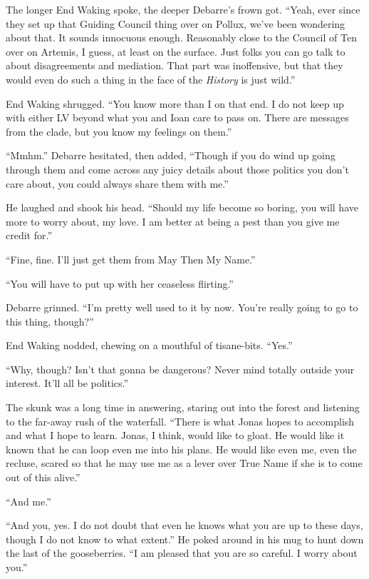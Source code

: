The longer End Waking spoke, the deeper Debarre's frown got. ``Yeah, ever since they set up that Guiding Council thing over on Pollux, we've been wondering about that. It sounds innocuous enough. Reasonably close to the Council of Ten over on Artemis, I guess, at least on the surface. Just folks you can go talk to about disagreements and mediation. That part was inoffensive, but that they would even do such a thing in the face of the \emph{History} is just wild.''

End Waking shrugged. ``You know more than I on that end. I do not keep up with either LV beyond what you and Ioan care to pass on. There are messages from the clade, but you know my feelings on them.''

``Mmhm.'' Debarre hesitated, then added, ``Though if you do wind up going through them and come across any juicy details about those politics you don't care about, you could always share them with me.''

He laughed and shook his head. ``Should my life become so boring, you will have more to worry about, my love. I am better at being a pest than you give me credit for.''

``Fine, fine. I'll just get them from May Then My Name.''

``You will have to put up with her ceaseless flirting.''

Debarre grinned. ``I'm pretty well used to it by now. You're really going to go to this thing, though?''

End Waking nodded, chewing on a mouthful of tisane-bits. ``Yes.''

``Why, though? Isn't that gonna be dangerous? Never mind totally outside your interest. It'll all be politics.''

The skunk was a long time in answering, staring out into the forest and listening to the far-away rush of the waterfall. ``There is what Jonas hopes to accomplish and what I hope to learn. Jonas, I think, would like to gloat. He would like it known that he can loop even me into his plans. He would like even me, even the recluse, scared so that he may use me as a lever over True Name if she is to come out of this alive.''

``And me.''

``And you, yes. I do not doubt that even he knows what you are up to these days, though I do not know to what extent.'' He poked around in his mug to hunt down the last of the gooseberries. ``I am pleased that you are so careful. I worry about you.''

